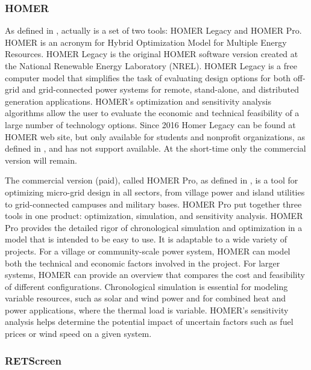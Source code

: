 \subsubsection{HOMER}

As defined in \cite{HOMER}, actually is a set of two tools: HOMER Legacy and HOMER Pro. HOMER is an acronym for Hybrid Optimization Model for Multiple Energy Resources. HOMER Legacy is the original HOMER software version created at the National Renewable Energy Laboratory (NREL). HOMER Legacy is a free computer model that simplifies the task of evaluating design options for both off-grid and grid-connected power systems for remote, stand-alone, and distributed generation applications. HOMER's optimization and sensitivity analysis algorithms allow the user to evaluate the economic and technical feasibility of a large number of technology options. Since 2016 Homer Legacy can be found at HOMER web site, but only available for students and nonprofit organizations, as defined in \cite{HOMER}, and has not support available. At the short-time only the commercial version will remain.
 
The commercial version (paid), called HOMER Pro, as defined in \cite{Swarnkar}, is a tool for optimizing micro-grid design in all sectors, from village power and island utilities to grid-connected campuses and military bases. HOMER Pro put together three tools in one product: optimization, simulation, and sensitivity analysis. HOMER Pro provides the detailed rigor of chronological simulation and optimization in a model that is intended to be easy to use. It is adaptable to a wide variety of projects. For a village or community-scale power system, HOMER can model both the technical and economic factors involved in the project. For larger systems, HOMER can provide an overview that compares the cost and feasibility of different configurations. Chronological simulation is essential for modeling variable resources, such as solar and wind power and for combined heat and power applications, where the thermal load is variable. HOMER's sensitivity analysis helps determine the potential impact of uncertain factors such as fuel prices or wind speed on a given system. 

\subsubsection{RETScreen}

